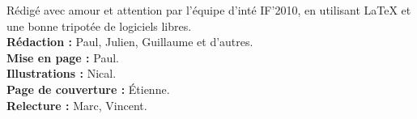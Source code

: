 

\tableofcontents
\begin{multicols}{2}
{
    \begin{center}
\footnotesize
Rédigé avec amour et attention par l'équipe d'inté IF'2010, en utilisant
\LaTeX{} et une bonne tripotée de logiciels libres. \\
\textbf{Rédaction : }Paul, Julien, Guillaume et d'autres.\\
\textbf{Mise en page : }Paul.\\
\textbf{Illustrations :} Nical.\\
\textbf{Page de couverture :} Étienne.\\
\textbf{Relecture :} Marc, Vincent.\\
\normalsize
\cc \ccby \ccnc \ccsa
\end{center}
}
\end{multicols}

